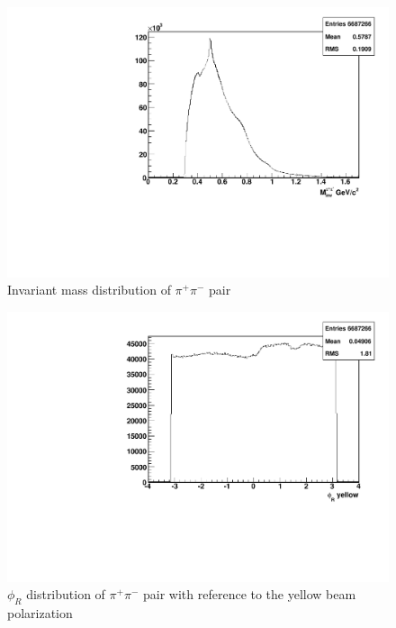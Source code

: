 \documentclass[letterpaper, abstract = on,listof=totoc, bibliography=totoc]{scrreprt}
\newcommand{\phir}{\phi_{R}}
\newcommand{\pip}{\pi^+}
\newcommand{\pim}{\pi^-}
\newcommand{\pair}{$\pip\pim$ }
\begin{document}
\begin{figure}
\begin{center}
\includegraphics[width = .8\textwidth]{hInvarM}
\caption[Invariant mass distribution of \pair pair]{Invariant mass distribution of \pair pair}
\label{fig:invarM}
\end{center}
\end{figure}

\begin{figure}
\begin{center}
\includegraphics[width = .8\textwidth]{hPhiRy}
\caption[$\phir$ distribution of \pair pair with reference to the yellow beam polarization]{$\phir$ distribution of \pair pair with reference to the yellow beam polarization}
\label{fig:phiry}
\end{center}
\end{figure}
\end{document}
